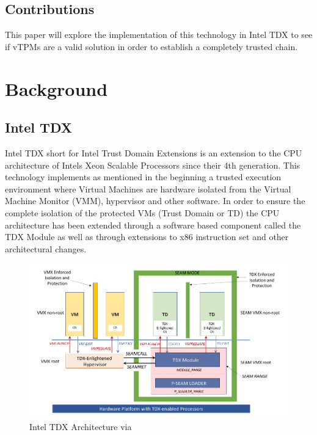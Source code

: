 \documentclass[sigplan,screen,nonacm]{acmart}
\begin{document}
\subsection{Contributions}

This paper will explore the implementation of this technology in Intel TDX to see if vTPMs are a valid solution in order to establish a completely trusted chain.

\section{Background}

\subsection{Intel TDX}
Intel TDX short for Intel Trust Domain Extensions is an extension to the CPU architecture of Intels Xeon Scalable Processors since their 4th generation\cite{Intel-TDX-support}.
This technology implements as mentioned in the beginning a trusted execution environment where Virtual Machines are hardware isolated from the Virtual Machine Monitor (VMM), hypervisor and other software.
In order to ensure the complete isolation of the protected VMs (Trust Domain or TD) the CPU architecture has been extended through a software based component called the TDX Module as well as through extensions to x86 instruction set and other architectural changes.

\begin{figure}
  \centering
  \includegraphics[width=\linewidth]{pictures/Intel_TDX_Architecture.png}
  \caption{Intel TDX Architecture via \cite{cheng2023intel}}
  \label{fig:tdxarch}
\end{figure}
\end{document}
